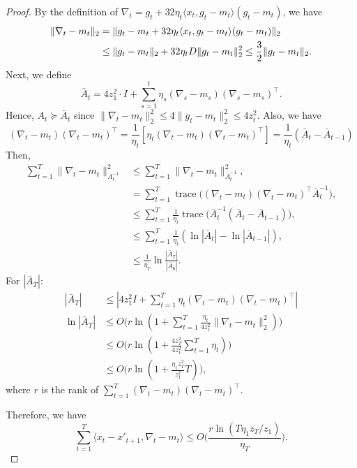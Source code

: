 \documentclass{article}
\theoremstyle{plain}
\theoremstyle{definition}
\theoremstyle{remark}
\DeclareMathOperator{\tr}{trace}
\begin{document}
\begin{proof}
By the definition of $\nabla_t=g_t+32\eta_t\langle x_t,g_t-m_t\rangle(g_t-m_t)$, we have
\begin{align}
\|\nabla_t-m_t\|_2&=\|g_t-m_t+32\eta_t\langle x_t,g_t-m_t\rangle(g_t-m_t)\|_2\notag\\
&\leq \|g_t-m_t\|_2+32\eta_tD\|g_t-m_t\|_2^2\leq \frac{3}{2} \|g_t-m_t\|_2.\label{eq:norm of g_t - m_t and nabla_t - m_t}
\end{align}
Next, we define 
\begin{equation*}
\bar{A}_t=4z_1^2\cdot I+\sum_{s=1}^t \eta_s (\nabla_s-m_s)(\nabla_s-m_s)^\top.
\end{equation*}
Hence, $A_t\succeq \bar{A}_t$ since $\|\nabla_t-m_t\|_2^2\leq 4\|g_t-m_t\|_2^2\leq 4z_t^2$. Also, we have
\begin{equation*}
(\nabla_t-m_t)(\nabla_t-m_t)^\top=\frac{1}{\eta_t}[\eta_t(\nabla_t-m_t)(\nabla_t-m_t)^\top]=\frac{1}{\eta_t} (\bar{A}_t-\bar{A}_{t-1})
\end{equation*}
Then,
\begin{align*}
\sum_{t=1}^T \|\nabla_t-m_t\|_{A_t^{-1}}^2&\leq \sum_{t=1}^T \|\nabla_t-m_t\|_{\bar{A}_t^{-1}}^2,\\
&=\sum_{t=1}^T \tr\Big((\nabla_t-m_t)(\nabla_t-m_t)^\top \bar{A}_t^{-1}\Big),\\
&\leq \sum_{t=1}^T \frac{1}{\eta_t}\tr\Big(\bar{A}_t^{-1}(\bar{A}_t-\bar{A}_{t-1})\Big),\\
&\leq \sum_{t=1}^T \frac{1}{\eta_t}(\ln|\bar{A}_t|-\ln|\bar{A}_{t-1}|),\\
&\leq \frac{1}{\eta_T}\ln\frac{|\bar{A}_T|}{|\bar{A}_0|}.
\end{align*}
For $|\bar{A}_T|$:
\begin{align*}
|\bar{A}_T|&\leq |4z_1^2 I+\sum_{t=1}^T \eta_t(\nabla_t-m_t)(\nabla_t-m_t)^\top|\\
\ln |\bar{A}_T|&\leq O\Big(r\ln(1+\sum_{t=1}^T \frac{\eta_t}{4z_1^2}\|\nabla_t-m_t\|_2^2)\Big)\\
&\leq O\Big(r\ln(1+\frac{4z_T^2}{4z_1^2}\sum_{t=1}^T \eta_t)\Big)\\
&\leq O\Big(r\ln(1+\frac{\eta_1 z_T^2}{z_1^2}T)\Big),
\end{align*}
where $r$ is the rank of $\sum_{t=1}^T (\nabla_t-m_t)(\nabla_t-m_t)^\top$.

Therefore, we have
\begin{equation*}\label{eq:part1_final}
\sum_{t=1}^T\langle x_{t}-x'_{t+1},\nabla_t-m_t\rangle\leq O\Big(\frac{r\ln(T\eta_1 z_T/z_1)}{\eta_T}\Big).
\end{equation*}
\end{proof}
\end{document}
